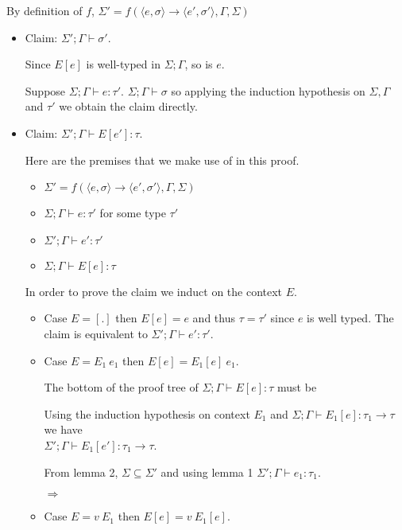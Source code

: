 \begin{enumerate}[(a)]
\begin{enumerate}[i.]
By definition of $f$, $\Sigma' = f(\langle e, \sigma \rangle \rightarrow \langle e', \sigma' \rangle, \Gamma, \Sigma)$

\begin{itemize}
\item Claim: $\Sigma';\Gamma \vdash \sigma'$.

Since $E[e]$ is well-typed in $\Sigma; \Gamma$, so is $e$. 

Suppose $\Sigma;\Gamma \vdash e : \tau'$. $\Sigma;\Gamma \vdash \sigma$ so applying the induction hypothesis on $\Sigma, \Gamma$ and $\tau'$ we obtain the claim directly.
\item Claim: $\Sigma';\Gamma \vdash E[e'] : \tau$.

Here are the premises that we make use of in this proof.
\begin{itemize}
  \item $\Sigma' = f(\langle e, \sigma \rangle \rightarrow \langle e', \sigma' \rangle, \Gamma, \Sigma)$
  \item $\Sigma;\Gamma \vdash e : \tau'$ for some type $\tau'$
  \item $\Sigma';\Gamma \vdash e' : \tau'$ 
  \item $\Sigma;\Gamma \vdash E[e] : \tau$ 
\end{itemize}
In order to prove the claim we induct on the context $E$.
\begin{itemize}
  \item Case $E = [.]$ then $E[e] = e$ and thus $\tau = \tau'$ since $e$ is well typed. The claim is equivalent to $\Sigma';\Gamma \vdash e' : \tau'$.
  \item Case $E = E_1~e_1$ then $E[e] = E_1[e]~e_1$. 

  The bottom of the proof tree of $\Sigma;\Gamma \vdash E[e] : \tau$ must be 

  Using the induction hypothesis on context $E_1$ and $\Sigma;\Gamma \vdash E_1[e] : \tau_1 \rightarrow\tau$ we have \\
  $\Sigma';\Gamma \vdash E_1[e'] : \tau_1 \rightarrow\tau$.

  From lemma 2, $\Sigma \subseteq \Sigma'$ and using lemma 1 $\Sigma' ; \Gamma \vdash e_1 : \tau_1$.

  $\Rightarrow$
  \item Case $E = v~E_1$ then $E[e] = v~E_1[e]$. 


\end{itemize}
\end{itemize}
\end{enumerate}
\end{enumerate}
